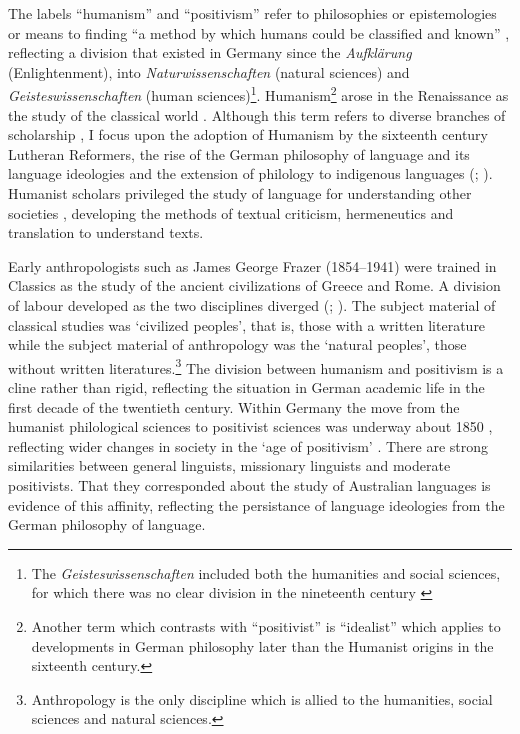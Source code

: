 \documentclass[output=paper]{langsci/langscibook}
\begin{document}
The labels ``humanism'' and ``positivism'' refer to philosophies or epistemologies or means to finding “a method by which humans could be classified and known” \citep[186]{zimmerman_anthropology_2001}, reflecting a division that existed in Germany since the \textit{Aufklärung} (Enlightenment), into \textit{Naturwissenschaften} (natural sciences) and \textit{Geisteswissenschaften} (human sciences)\footnote{The \textit{Geisteswissenschaften} included both the humanities and social sciences, for which there was no clear division in the nineteenth century \citep[282]{adams_philosophical_1998}}. Humanism\footnote{Another term which contrasts with ``positivist'' is ``idealist'' \citep{vossler_positivimus_1904} which applies to developments in German philosophy later than the Humanist origins in the sixteenth century.} arose in the Renaissance as the study of the classical world \citep[172]{giustiniani_homo_1985}. Although this term refers to diverse branches of scholarship \citep[258]{adams_philosophical_1998}, I focus upon the adoption of Humanism by the sixteenth century Lutheran Reformers, the rise of the German philosophy of language and its language ideologies and the extension of philology to indigenous languages (\citealt[328]{harding_indigenous_2018}; \citealt{moore_language_forthcoming}). Humanist scholars privileged the study of language for understanding other societies \citep[53]{zimmerman_anthropology_2001}, developing the methods of textual criticism, hermeneutics and translation to understand texts. 

Early anthropologists such as James George Frazer (1854--1941) were trained in Classics as the study of the ancient civilizations of Greece and Rome. A division of labour developed as the two disciplines diverged (\citealt{marett_anthropology_1908}; \citealt{kluckhohn_anthropology_1961}). The subject material of classical studies was ‘civilized peoples’, that is, those with a written literature while the subject material of anthropology was the ‘natural peoples’, those without written literatures.\footnote{Anthropology is the only discipline which is allied to the humanities, social sciences and natural sciences.} The division between humanism and positivism is a cline rather than rigid, reflecting the situation in German academic life in the first decade of the twentieth century. Within Germany the move from the humanist philological sciences to positivist sciences was underway about 1850 \citep[26]{smith_politics_1991}, reflecting wider changes in society in the ‘age of positivism’ \citep[120]{stocking_virchow_1996}. There are strong similarities between general linguists, missionary linguists and moderate positivists. That they corresponded about the study of Australian languages is evidence of this affinity, reflecting the persistance of language ideologies from the German philosophy of language.
 
\end{document}
